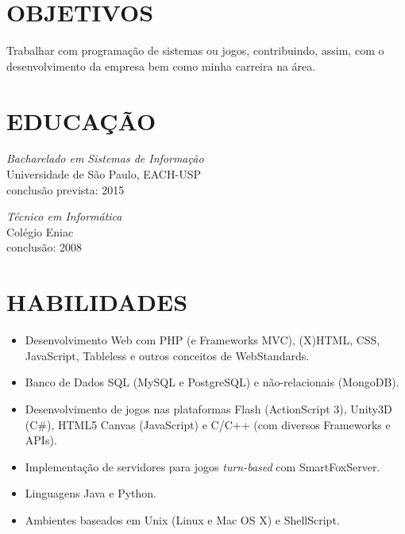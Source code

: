 \documentclass[line,margin]{res}
\begin{document}

\address{Av. Sete de Setembro, 1256 - Guarulhos - São Paulo}
\address{(11) 99932-6440 - bruno@croci.me - \href{http://bruno.croci.me/}{http://bruno.croci.me/}}

 
\begin{resume}
 
\section{OBJETIVOS} Trabalhar com programação de sistemas ou jogos, contribuindo,
                 assim, com o desenvolvimento da empresa bem como minha carreira
                 na área.
 
 
\section{EDUCAÇÃO} {\sl Bacharelado em Sistemas de Informação} \\
                Universidade de São Paulo, EACH-USP \\
                conclusão prevista: 2015
                
                {\sl Técnico em Informática} \\
                Colégio Eniac \\
                conclusão: 2008 \\
 
 
\section{HABILIDADES} \begin{itemize}  \itemsep -3pt
                 \item Desenvolvimento Web com PHP (e Frameworks MVC), (X)HTML, CSS, JavaScript, 
                       Tableless e outros conceitos de WebStandards.
                 \item Banco de Dados SQL (MySQL e PostgreSQL) e não-relacionais (MongoDB).
                 \item Desenvolvimento de jogos nas plataformas Flash (ActionScript 3), Unity3D (C\#),
                       HTML5 Canvas (JavaScript) e C/C++ (com diversos Frameworks e APIs).
                 \item Implementação de servidores para jogos {\sl turn-based} com SmartFoxServer.
                 \item Linguagens Java e Python.
                 \item Ambientes baseados em Unix (Linux e Mac OS X) e ShellScript.
                 \end{itemize}
 

\end{resume}
\end{document}
